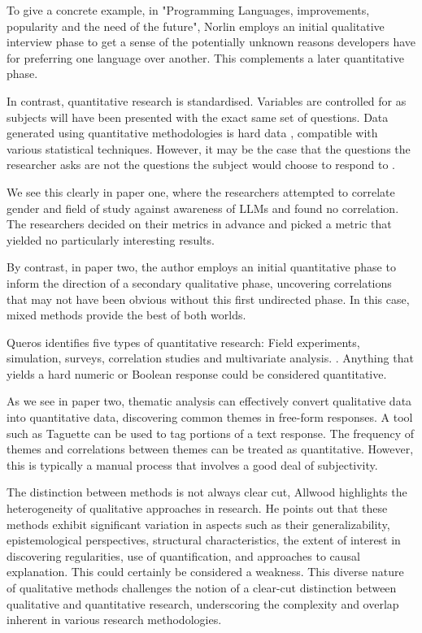 \documentclass[12pt]{article}
\begin{document}
To give a concrete example, in "Programming Languages, improvements, popularity and the need of the future", Norlin employs an initial qualitative interview phase to get a sense of the potentially unknown reasons developers have for preferring one language over another. This complements a later quantitative phase. \cite{norlins}

In contrast, quantitative research is standardised. Variables are controlled for as subjects will have been presented with the exact same set of questions. Data generated using quantitative methodologies is hard data \cite{allwood}, compatible with various statistical techniques. However, it may be the case that the questions the researcher asks are not the questions the subject would choose to respond to \cite{mertens}. 

We see this clearly in paper one, where the researchers attempted to correlate gender and field of study against awareness of LLMs and found no correlation. The researchers decided on their metrics in advance and picked a metric that yielded no particularly interesting results. \cite{paper1}

By contrast, in paper two, the author employs an initial quantitative phase to inform the direction of a secondary qualitative phase, uncovering correlations that may not have been obvious without this first undirected phase. In this case, mixed methods provide the best of both worlds. \cite{paper2}

Queros identifies five types of quantitative research: Field experiments, simulation, surveys, correlation studies and multivariate analysis. \cite{queros}. Anything that yields a hard numeric or Boolean response could be considered quantitative. \cite{allwood}

As we see in paper two, thematic analysis can effectively convert qualitative data into quantitative data, discovering common themes in free-form responses. A tool such as Taguette \cite{taguette} can be used to tag portions of a text response. The frequency of themes and correlations between themes can be treated as quantitative. However, this is typically a manual process that involves a good deal of subjectivity. \cite{allwood}

The distinction between methods is not always clear cut, Allwood highlights the heterogeneity of qualitative approaches in research. He points out that these methods exhibit significant variation in aspects such as their generalizability, epistemological perspectives, structural characteristics, the extent of interest in discovering regularities, use of quantification, and approaches to causal explanation. This could certainly be considered a weakness. This diverse nature of qualitative methods challenges the notion of a clear-cut distinction between qualitative and quantitative research, underscoring the complexity and overlap inherent in various research methodologies. \cite{allwood}
\end{document}
